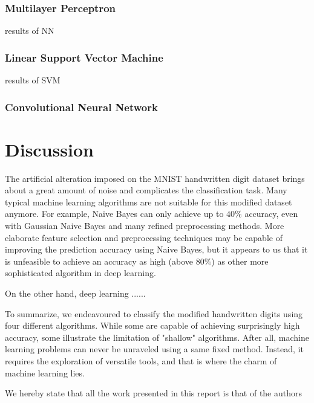 \documentclass{acm_proc_article-sp}
\begin{document}
\subsubsection{Multilayer Perceptron}
results of NN

\subsubsection{Linear Support Vector Machine }
results of SVM

\subsubsection{Convolutional Neural Network}




\section{Discussion}
The artificial alteration imposed on the MNIST handwritten digit dataset brings about a great amount of noise and complicates the classification task. Many typical machine learning algorithms are not suitable for this modified dataset anymore. For example, Naive Bayes can only achieve up to  $40 \%$ accuracy, even with Gaussian Naive Bayes and many refined preprocessing methods.  More elaborate feature selection and preprocessing techniques may be capable of improving the prediction accuracy using Naive Bayes, but it appears to us that it is unfeasible to achieve an accuracy as high (above $80 \%$) as other more sophisticated  algorithm in deep learning.

On the other hand, deep learning ......

To summarize, we endeavoured to classify the modified handwritten digits using four different algorithms. While some are capable of  achieving surprisingly high accuracy,  some illustrate the limitation of "shallow" algorithms. After all, machine learning problems can never be unraveled using a same fixed method. Instead, it requires the exploration of versatile tools, and that is where the charm of machine learning lies.


We	hereby	state	that	all	the	work	 presented	in	this	report	is	that	of	the	authors

  
\end{document}
